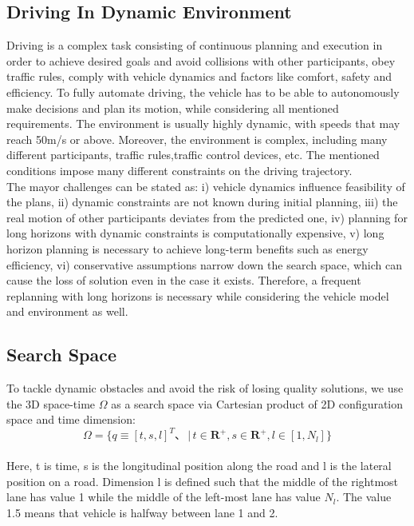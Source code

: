 \documentclass{report}
\begin{document}
 \subsection{Driving In Dynamic Environment}
 Driving is a complex task consisting of continuous planning and execution in order to achieve desired goals and avoid collisions with other participants, obey traffic rules, comply with vehicle dynamics and factors like comfort, safety and efficiency. To fully automate driving, the vehicle has to be able to autonomously make decisions and plan its motion, while considering all mentioned requirements. The environment is usually highly dynamic, with speeds that may reach 50m/s or above. Moreover, the environment is complex, including many different participants, traffic rules,traffic control devices, etc. The mentioned conditions impose many different constraints on the driving trajectory.\\
 \indent
 The mayor challenges can be stated as: i) vehicle dynamics influence feasibility of the plans, ii) dynamic constraints are not known during initial planning, iii) the real motion of other participants deviates from the predicted one, iv) planning for long horizons with dynamic constraints is computationally expensive, v) long horizon planning is necessary to achieve long-term benefits such as energy efficiency, vi) conservative assumptions narrow down the search space, which can cause the loss of solution even in the case it exists. Therefore, a frequent replanning with long horizons is necessary while considering the vehicle model and environment as well.
 \subsection{Search Space}
 To tackle dynamic obstacles and avoid the risk of losing quality solutions, we use the 3D space-time $\Omega$ as a search space via Cartesian product of 2D configuration space and time dimension:\\
 \begin{equation}\label{def:ratio}
 \Omega = \{q \equiv [t,s,l]^T 、\, |\, t\in \mathbf{R}^+, s\in \mathbf{R}^+ ,l \in[1,N_l]\}
 \end{equation}\\
 \indent
 Here, t is time, s is the longitudinal position along the road and l is the lateral position on a road. Dimension l is defined such that the middle of the rightmost lane has value 1 while the middle of the left-most lane has value $N_l$. The value 1.5 means that vehicle is halfway between lane 1 and 2.
\end{document}
